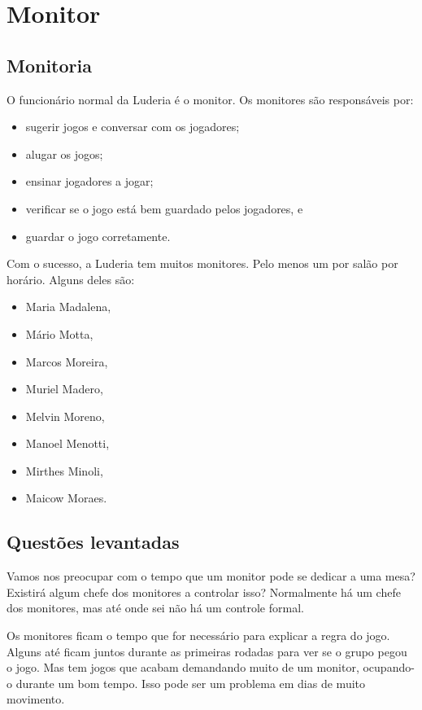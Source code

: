 \chapter{Monitor}
\label{chap:monitor}

\section{Monitoria}

O funcionário normal da Luderia é o monitor. Os monitores são responsáveis por: 
\begin{itemize}
    \item sugerir jogos e conversar com os jogadores;
    \item alugar os jogos;
    \item ensinar jogadores a jogar;
    \item verificar se o jogo está bem guardado pelos jogadores, e
    \item guardar o jogo corretamente.
\end{itemize}

Com o sucesso, a Luderia tem muitos monitores. Pelo menos um por salão por horário. Alguns deles são:
\begin{itemize}
    \item Maria Madalena,
    \item Mário Motta,
    \item Marcos Moreira,
    \item Muriel Madero,
    \item Melvin Moreno,
    \item Manoel Menotti,
    \item Mirthes Minoli,
    \item Maicow Moraes.
\end{itemize}


\section{Questões levantadas}

Vamos nos preocupar com o tempo que um monitor pode se dedicar a uma mesa? Existirá algum chefe dos monitores a controlar isso? 
Normalmente há um chefe dos monitores, mas até onde sei não há um controle formal. 

Os monitores ficam o tempo que for necessário para explicar a regra do jogo. Alguns até ficam juntos durante as primeiras rodadas para ver se o grupo pegou o jogo. Mas tem jogos que acabam demandando muito de um monitor, ocupando-o durante um bom tempo. Isso pode ser um problema em dias de muito movimento. 

